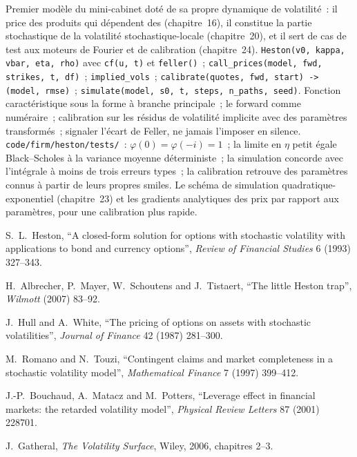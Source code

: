 \begin{build}
 Premier modèle du mini-cabinet doté de sa propre dynamique de volatilité~: il price des produits qui
dépendent des  (chapitre~16), il constitue la partie stochastique de la volatilité stochastique-locale (chapitre~20),
et il sert de cas de test aux moteurs de Fourier et de calibration (chapitre~24).
 \texttt{Heston(v0, kappa, vbar, eta, rho)} avec \texttt{cf(u, t)} et \texttt{feller()}~;
\texttt{call\_prices(model, fwd, strikes, t, df)}~; \texttt{implied\_vols}~; \texttt{calibrate(quotes, fwd,
start) -> (model, rmse)}~; \texttt{simulate(model, s0, t, steps, n\_paths, seed)}.
 Fonction caractéristique sous la forme à branche principale~; le forward comme numéraire~; calibration sur
les résidus de volatilité implicite avec des paramètres transformés~; signaler l'écart de Feller, ne jamais l'imposer en silence.
 \texttt{code/firm/heston/tests/}~: $\varphi(0)=\varphi(-i)=1$~; la limite en $\eta$ petit
égale Black--Scholes à la variance moyenne déterministe~; la simulation concorde avec l'intégrale à moins de
trois erreurs types~; la calibration retrouve des paramètres connus à partir de leurs propres smiles.
 Le schéma de simulation quadratique-exponentiel (chapitre~23) et les gradients analytiques des prix
par rapport aux paramètres, pour une calibration plus rapide.
\end{build}

\begin{omsources}
\item S.~L.~Heston, ``A closed-form solution for options with stochastic volatility with applications to bond
and currency options'', \emph{Review of Financial Studies} 6 (1993) 327--343.
\item H.~Albrecher, P.~Mayer, W.~Schoutens and J.~Tistaert, ``The little Heston trap'', \emph{Wilmott} (2007)
83--92.
\item J.~Hull and A.~White, ``The pricing of options on assets with stochastic volatilities'', \emph{Journal of
Finance} 42 (1987) 281--300.
\item M.~Romano and N.~Touzi, ``Contingent claims and market completeness in a stochastic volatility model'',
\emph{Mathematical Finance} 7 (1997) 399--412.
\item J.-P.~Bouchaud, A.~Matacz and M.~Potters, ``Leverage effect in financial markets: the retarded
volatility model'', \emph{Physical Review Letters} 87 (2001) 228701.
\item J.~Gatheral, \emph{The Volatility Surface}, Wiley, 2006, chapitres 2--3.
\end{omsources}

